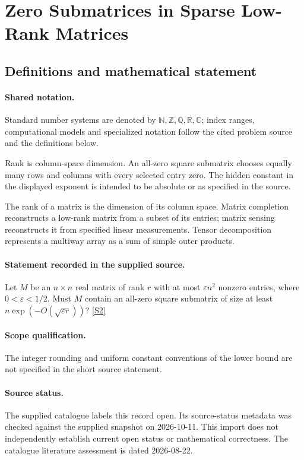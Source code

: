 \documentclass[11pt]{article}
\newcommand{\sref}[2]{\hyperlink{source:#1:#2}{[S#2]}}
\begin{document}
\section{Zero Submatrices in Sparse Low-Rank Matrices}\label{statement}

\subsection{Definitions and mathematical statement}

\paragraph{Shared notation.}Standard number systems are denoted by $\mathbb N,\mathbb Z,\mathbb Q,\mathbb R,\mathbb C$; index ranges, computational models and specialized notation follow the cited problem source and the definitions below.


Rank is column-space dimension. An all-zero square submatrix chooses equally many rows and columns with every selected entry zero. The hidden constant in the displayed exponent is intended to be absolute or as specified in the source.

The rank of a matrix is the dimension of its column space. Matrix completion reconstructs a low-rank matrix from a subset of its entries; matrix sensing reconstructs it from specified linear measurements. Tensor decomposition represents a multiway array as a sum of simple outer products.
\paragraph{Statement recorded in the supplied source.}
Let $M$ be an $n\times n$ real matrix of rank $r$ with at most $\varepsilon n^2$ nonzero entries, where $0<\varepsilon<1/2$. Must $M$ contain an all-zero square submatrix of size at least $n\exp\!\left(-O(\sqrt{\varepsilon r})\right)$? \sref{statement}{2}
\paragraph{Scope qualification.}
The integer rounding and uniform constant conventions of the lower bound are not specified in the short source statement.
\paragraph{Source status.}
The supplied catalogue labels this record open. Its source-status metadata was checked against the supplied snapshot on 2026-10-11. This import does not independently establish current open status or mathematical correctness. The catalogue literature assessment is dated 2026-08-22.
\end{document}

